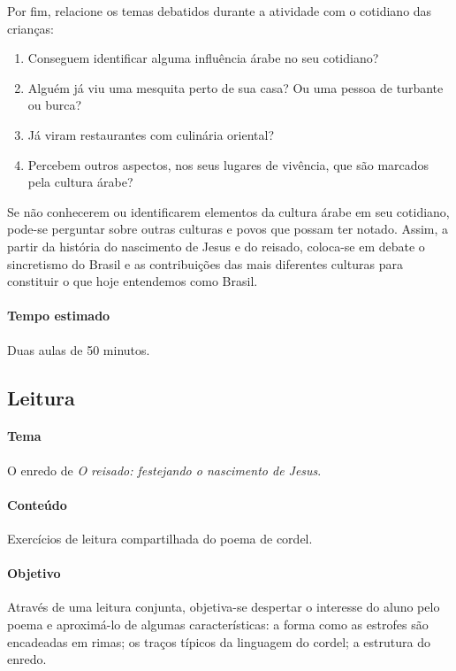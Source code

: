 \documentclass[11pt]{extarticle}
\begin{document}
Por fim, relacione os temas debatidos durante a atividade com o cotidiano das crianças: 

\begin{enumerate}
\item Conseguem identificar alguma influência árabe no seu cotidiano?

\item Alguém já viu uma mesquita perto de sua casa? Ou uma pessoa de turbante ou burca?

\item Já viram restaurantes com culinária oriental?

\item Percebem outros aspectos, nos seus lugares de vivência, que são marcados pela cultura árabe?
\end{enumerate}

Se não conhecerem ou identificarem elementos da cultura árabe em seu cotidiano, pode-se perguntar sobre outras culturas e povos que possam ter notado. Assim, a partir da história do nascimento de Jesus e do reisado, coloca-se em debate o sincretismo do Brasil e as contribuições das mais diferentes culturas para constituir o que hoje entendemos como Brasil.


\paragraph{Tempo estimado} Duas aulas de 50 minutos.

\subsection{Leitura}



\paragraph{Tema} O enredo de \textit{O reisado: festejando o nascimento de Jesus}.

\paragraph{Conteúdo} Exercícios de leitura compartilhada do poema de cordel.

\paragraph{Objetivo} Através de uma leitura conjunta, objetiva-se despertar o interesse do aluno pelo poema e aproximá-lo de algumas características: a forma como as estrofes são encadeadas em rimas; os traços típicos da linguagem do cordel; a estrutura do enredo.
\end{document}
